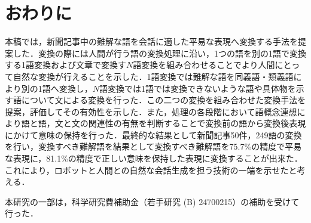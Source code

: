 \documentclass[japanese]{jnlp_1.4}
\begin{document}
\section{おわりに}

本稿では，新聞記事中の難解な語を会話に適した平易な表現へ変換する手法を提案した．変換の際には人間が行う語の変換処理に沿い，1つの語を別の1語で変換する1語変換および文章で変換す$N$語変換を組み合わせることでより人間にとって自然な変換が行えることを示した．1語変換では難解な語を同義語・類義語により別の1語へ変換し，$N$語変換では1語では変換できないような語や具体物を示す語について文による変換を行った．この二つの変換を組み合わせた変換手法を提案，評価してその有効性を示した．また，処理の各段階において語概念連想により語と語，文と文の関連性の有無を判断することで変換前の語から変換後表現にかけて意味の保持を行った．最終的な結果として新聞記事50件，249語の変換を行い，変換すべき難解語を結果として変換すべき難解語を75.7\%の精度で平易な表現に，81.1\%の精度で正しい意味を保持した表現に変換することが出来た．これにより，ロボットと人間との自然な会話生成を担う技術の一端を示せたと考える．


\acknowledgment

本研究の一部は，科学研究費補助金（若手研究 (B) 24700215）の補助を受けて行った．
\end{document}
